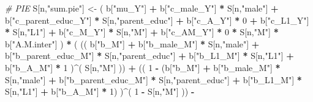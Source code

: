\documentclass[
]{book}
\newenvironment{Shaded}{\begin{snugshade}}{\end{snugshade}}
\newcommand{\CommentTok}[1]{\textcolor[rgb]{0.56,0.35,0.01}{\textit{#1}}}
\newcommand{\DecValTok}[1]{\textcolor[rgb]{0.00,0.00,0.81}{#1}}
\newcommand{\NormalTok}[1]{#1}
\newcommand{\OtherTok}[1]{\textcolor[rgb]{0.56,0.35,0.01}{#1}}
\newcommand{\SpecialCharTok}[1]{\textcolor[rgb]{0.81,0.36,0.00}{\textbf{#1}}}
\newcommand{\StringTok}[1]{\textcolor[rgb]{0.31,0.60,0.02}{#1}}
\begin{document}
\begin{Shaded}
\begin{Highlighting}[]
    \CommentTok{\# PIE }
\NormalTok{    S[n,}\StringTok{"sum.pie"}\NormalTok{] }\OtherTok{\textless{}{-}}\NormalTok{ ( b[}\StringTok{"mu\_Y"}\NormalTok{] }\SpecialCharTok{+} 
\NormalTok{                          b[}\StringTok{"c\_male\_Y"}\NormalTok{] }\SpecialCharTok{*}\NormalTok{ S[n,}\StringTok{"male"}\NormalTok{] }\SpecialCharTok{+} 
\NormalTok{                          b[}\StringTok{"c\_parent\_educ\_Y"}\NormalTok{] }\SpecialCharTok{*}\NormalTok{ S[n,}\StringTok{"parent\_educ"}\NormalTok{] }\SpecialCharTok{+} 
\NormalTok{                          b[}\StringTok{"c\_A\_Y"}\NormalTok{] }\SpecialCharTok{*} \DecValTok{0} \SpecialCharTok{+} 
\NormalTok{                          b[}\StringTok{"c\_L1\_Y"}\NormalTok{] }\SpecialCharTok{*}\NormalTok{ S[n,}\StringTok{"L1"}\NormalTok{] }\SpecialCharTok{+}
\NormalTok{                          b[}\StringTok{"c\_M\_Y"}\NormalTok{] }\SpecialCharTok{*}\NormalTok{ S[n,}\StringTok{"M"}\NormalTok{] }\SpecialCharTok{+}
\NormalTok{                          b[}\StringTok{"c\_AM\_Y"}\NormalTok{] }\SpecialCharTok{*} \DecValTok{0} \SpecialCharTok{*}\NormalTok{ S[n,}\StringTok{"M"}\NormalTok{] }\SpecialCharTok{*}\NormalTok{ b[}\StringTok{"A.M.inter"}\NormalTok{] ) }\SpecialCharTok{*}
\NormalTok{      ( (( b[}\StringTok{"b\_M"}\NormalTok{] }\SpecialCharTok{+} 
\NormalTok{             b[}\StringTok{"b\_male\_M"}\NormalTok{] }\SpecialCharTok{*}\NormalTok{ S[n,}\StringTok{"male"}\NormalTok{] }\SpecialCharTok{+} 
\NormalTok{             b[}\StringTok{"b\_parent\_educ\_M"}\NormalTok{] }\SpecialCharTok{*}\NormalTok{ S[n,}\StringTok{"parent\_educ"}\NormalTok{] }\SpecialCharTok{+} 
\NormalTok{             b[}\StringTok{"b\_L1\_M"}\NormalTok{] }\SpecialCharTok{*}\NormalTok{ S[n,}\StringTok{"L1"}\NormalTok{] }\SpecialCharTok{+}
\NormalTok{             b[}\StringTok{"b\_A\_M"}\NormalTok{] }\SpecialCharTok{*} \DecValTok{1}\NormalTok{ )}\SpecialCharTok{\^{}}\NormalTok{( S[n,}\StringTok{"M"}\NormalTok{] )) }\SpecialCharTok{+}
\NormalTok{          (( }\DecValTok{1} \SpecialCharTok{{-}}\NormalTok{ (b[}\StringTok{"b\_M"}\NormalTok{] }\SpecialCharTok{+} 
\NormalTok{                    b[}\StringTok{"b\_male\_M"}\NormalTok{] }\SpecialCharTok{*}\NormalTok{ S[n,}\StringTok{"male"}\NormalTok{] }\SpecialCharTok{+} 
\NormalTok{                    b[}\StringTok{"b\_parent\_educ\_M"}\NormalTok{] }\SpecialCharTok{*}\NormalTok{ S[n,}\StringTok{"parent\_educ"}\NormalTok{] }\SpecialCharTok{+} 
\NormalTok{                    b[}\StringTok{"b\_L1\_M"}\NormalTok{] }\SpecialCharTok{*}\NormalTok{ S[n,}\StringTok{"L1"}\NormalTok{] }\SpecialCharTok{+}
\NormalTok{                    b[}\StringTok{"b\_A\_M"}\NormalTok{] }\SpecialCharTok{*} \DecValTok{1}\NormalTok{) )}\SpecialCharTok{\^{}}\NormalTok{( }\DecValTok{1} \SpecialCharTok{{-}}\NormalTok{ S[n,}\StringTok{"M"}\NormalTok{] )) }\SpecialCharTok{{-}}

\end{Highlighting}
\end{Shaded}
\end{document}
